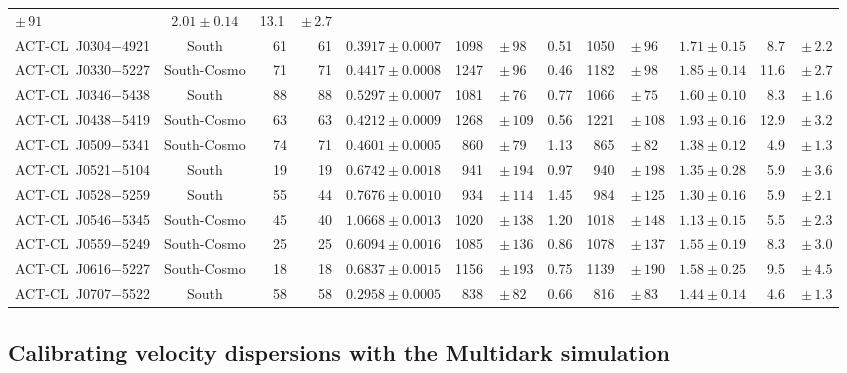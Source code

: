 {\begin{landscape}
\begin{table}
\begin{tabular}{l c r r c r@{}l c r@{}l c r@{}l}
$\pm\,91$ & $2.01\pm0.14$ & 13.1\, & $\pm\,2.7$ \\
ACT-CL~J0304$-$4921 & South & 61 & 61 & $0.3917\pm0.0007$ & 1098\, & $\pm\,98$ & 0.51 & 1050\, & 
$\pm\,96$ & $1.71\pm0.15$ & 8.7\, & $\pm\,2.2$ \\
ACT-CL~J0330$-$5227 & South-Cosmo & 71 & 71 & $0.4417\pm0.0008$ & 1247\, & $\pm\,96$ & 0.46 & 
1182\, & $\pm\,98$ & $1.85\pm0.14$ & 11.6\, & $\pm\,2.7$ \\
ACT-CL~J0346$-$5438 & South & 88 & 88 & $0.5297\pm0.0007$ & 1081\, & $\pm\,76$ & 0.77 & 1066\, & 
$\pm\,75$ & $1.60\pm0.10$ & 8.3\, & $\pm\,1.6$ \\
ACT-CL~J0438$-$5419 & South-Cosmo & 63 & 63 & $0.4212\pm0.0009$ & 1268\, & $\pm\,109$ & 0.56 & 
1221\, & $\pm\,108$ & $1.93\pm0.16$ & 12.9\, & $\pm\,3.2$ \\
ACT-CL~J0509$-$5341 & South-Cosmo & 74 & 71 & $0.4601\pm0.0005$ & 860\, & $\pm\,79$ & 1.13 & 865\, 
& $\pm\,82$ & $1.38\pm0.12$ & 4.9\, & $\pm\,1.3$ \\
ACT-CL~J0521$-$5104 & South & 19 & 19 & $0.6742\pm0.0018$ & 941\, & $\pm\,194$ & 0.97 & 940\, & 
$\pm\,198$ & $1.35\pm0.28$ & 5.9\, & $\pm\,3.6$ \\
ACT-CL~J0528$-$5259 & South & 55 & 44 & $0.7676\pm0.0010$ & 934\, & $\pm\,114$ & 1.45 & 984\, & 
$\pm\,125$ & $1.30\pm0.16$ & 5.9\, & $\pm\,2.1$ \\
ACT-CL~J0546$-$5345 & South-Cosmo & 45 & 40 & $1.0668\pm0.0013$ & 1020\, & $\pm\,138$ & 1.20 & 
1018\, & $\pm\,148$ & $1.13\pm0.15$ & 5.5\, & $\pm\,2.3$ \\
ACT-CL~J0559$-$5249 & South-Cosmo & 25 & 25 & $0.6094\pm0.0016$ & 1085\, & $\pm\,136$ & 0.86 & 
1078\, & $\pm\,137$ & $1.55\pm0.19$ & 8.3\, & $\pm\,3.0$ \\
ACT-CL~J0616$-$5227 & South-Cosmo & 18 & 18 & $0.6837\pm0.0015$ & 1156\, & $\pm\,193$ & 0.75 & 
1139\, & $\pm\,190$ & $1.58\pm0.25$ & 9.5\, & $\pm\,4.5$ \\
ACT-CL~J0707$-$5522 & South & 58 & 58 & $0.2958\pm0.0005$ & 838\, & $\pm\,82$ & 0.66 & 816\, & 
$\pm\,83$ & $1.44\pm0.14$ & 4.6\, & $\pm\,1.3$ \\
\hline
\end{tabular}
\end{table}
\end{landscape}
}

\subsection{Calibrating velocity dispersions with the Multidark simulation}
\label{s:sims}

